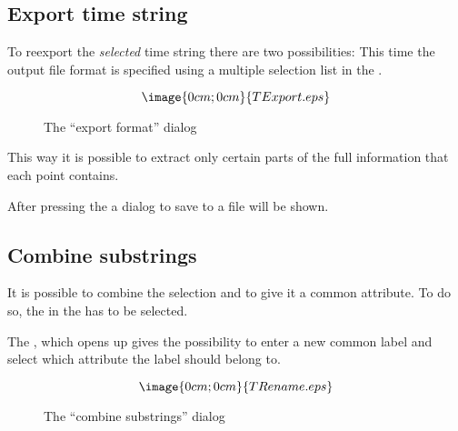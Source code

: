 
\subsection{Export time string}%
\label{timestring.export}

To reexport the {\it selected} time string there are
two possibilities:
This time the output file format is specified using a 
multiple selection list in the 
.

\begin{figure}[h]
$$\image{0cm;0cm}{TExport.eps}$$%
\caption{The ``export format'' dialog}%
\label{timestring.export.dialog}
\end{figure}

This way it is possible to extract only certain 
parts of the full information that each point contains.


After pressing the  a dialog to save to a file will be shown.


\subsection{Combine substrings}%
\label{timestring.rename}

It is possible to combine the selection and to give it a common
attribute. To do so, the  in the 
 has to be selected.

The ,
which opens up gives the possibility to enter a new common label and 
select which attribute the label should belong to.
\begin{figure}[h]
$$\image{0cm;0cm}{TRename.eps}$$%
\caption{The ``combine substrings'' dialog}%
\label{timestring.rename.dialog}
\end{figure}

